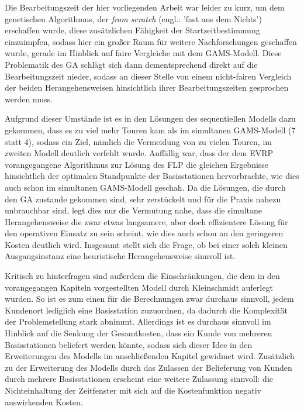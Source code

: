 \documentclass[a4paper,12pt,parskip,bibtotoc,liststotoc]{article}
\begin{document}
Die Bearbeitungszeit der hier vorliegenden Arbeit war leider zu kurz, um dem genetischen Algorithmus, der \textit{from scratch} (engl.: 'fast aus dem Nichts') erschaffen wurde, diese zusätzlichen Fähigkeit der Startzeitbestimmung einzuimpfen, sodass hier ein großer Raum für weitere Nachforschungen geschaffen wurde, gerade im Hinblick auf faire Vergleiche mit dem GAMS-Modell.
Diese Problematik des GA schlägt sich dann dementsprechend direkt auf die Bearbeitungszeit nieder, sodass an dieser Stelle von einem nicht-fairen Vergleich der beiden Herangehensweisen hinsichtlich ihrer Bearbeitungszeiten gesprochen werden muss.

Aufgrund dieser Umstände ist es in den Lösungen des sequentiellen Modells dazu gekommen, dass es zu viel mehr Touren kam als im simultanen GAMS-Modell (7 statt 4), sodass ein Ziel, nämlich die Vermeidung von zu vielen Touren, im zweiten Modell deutlich verfehlt wurde.
Auffällig war, dass der dem EVRP vorangegangene Algorithmus zur Lösung des FLP die gleichen Ergebnisse hinsichtlich der optimalen Standpunkte der Basisstationen hervorbrachte, wie dies auch schon im simultanen GAMS-Modell geschah. 
Da die Lösungen, die durch den GA zustande gekommen sind, sehr zerstückelt und für die Praxis nahezu unbrauchbar sind, legt dies nur die Vermutung nahe, dass die simultane Herangehensweise die zwar etwas langsamere, aber doch effizientere Lösung für den operativen Einsatz zu sein scheint, wie dies auch schon an den geringeren Kosten deutlich wird.	
Insgesamt stellt sich die Frage, ob bei einer solch kleinen Ausgangsinstanz eine heuristische Herangehensweise sinnvoll ist.


Kritisch zu hinterfragen sind außerdem die Einschränkungen, die dem in den vorangegangen Kapiteln vorgestellten Modell durch Kleinschmidt auferlegt wurden. 
So ist es zum einen für die Berechnungen zwar durchaus sinnvoll, jedem Kundenort lediglich eine Basisstation zuzuordnen, da dadurch die Komplexität der Problemstellung stark abnimmt. 
Allerdings ist es durchaus sinnvoll im Hinblick auf die Senkung der Gesamtkosten, dass ein Kunde von mehreren Basisstationen beliefert werden könnte, sodass sich dieser Idee in den Erweiterungen des Modells im anschließenden Kapitel gewidmet wird.
Zusätzlich zu der Erweiterung des Modells durch das Zulassen der Belieferung von Kunden durch mehrere Basisstationen erscheint eine weitere Zulassung sinnvoll: die Nichteinhaltung der Zeitfenster mit sich auf die Kostenfunktion negativ auswirkenden Kosten.


\newpage
\end{document}
